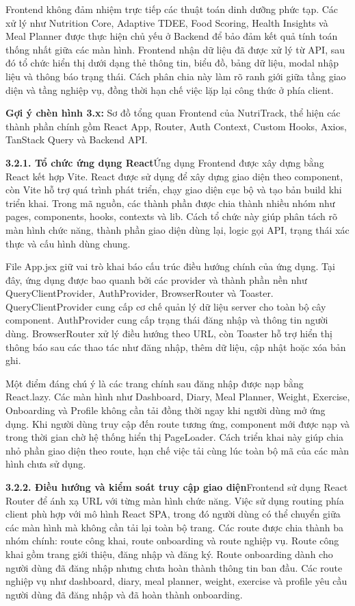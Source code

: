 Frontend không đảm nhiệm trực tiếp các thuật toán dinh dưỡng phức tạp. Các xử lý như Nutrition Core, Adaptive TDEE, Food Scoring, Health Insights và Meal Planner được thực hiện chủ yếu ở Backend để bảo đảm kết quả tính toán thống nhất giữa các màn hình. Frontend nhận dữ liệu đã được xử lý từ API, sau đó tổ chức hiển thị dưới dạng thẻ thông tin, biểu đồ, bảng dữ liệu, modal nhập liệu và thông báo trạng thái. Cách phân chia này làm rõ ranh giới giữa tầng giao diện và tầng nghiệp vụ, đồng thời hạn chế việc lặp lại công thức ở phía client.

\textbf{Gợi ý chèn hình 3.x:} Sơ đồ tổng quan Frontend của NutriTrack, thể hiện các thành phần chính gồm React App, Router, Auth Context, Custom Hooks, Axios, TanStack Query và Backend API.

\textbf{3.2.1. Tổ chức ứng dụng React}Ứng dụng Frontend được xây dựng bằng React kết hợp Vite. React được sử dụng để xây dựng giao diện theo component, còn Vite hỗ trợ quá trình phát triển, chạy giao diện cục bộ và tạo bản build khi triển khai. Trong mã nguồn, các thành phần được chia thành nhiều nhóm như pages, components, hooks, contexts và lib. Cách tổ chức này giúp phân tách rõ màn hình chức năng, thành phần giao diện dùng lại, logic gọi API, trạng thái xác thực và cấu hình dùng chung.

File App.jsx giữ vai trò khai báo cấu trúc điều hướng chính của ứng dụng. Tại đây, ứng dụng được bao quanh bởi các provider và thành phần nền như QueryClientProvider, AuthProvider, BrowserRouter và Toaster. QueryClientProvider cung cấp cơ chế quản lý dữ liệu server cho toàn bộ cây component. AuthProvider cung cấp trạng thái đăng nhập và thông tin người dùng. BrowserRouter xử lý điều hướng theo URL, còn Toaster hỗ trợ hiển thị thông báo sau các thao tác như đăng nhập, thêm dữ liệu, cập nhật hoặc xóa bản ghi.

Một điểm đáng chú ý là các trang chính sau đăng nhập được nạp bằng React.lazy. Các màn hình như Dashboard, Diary, Meal Planner, Weight, Exercise, Onboarding và Profile không cần tải đồng thời ngay khi người dùng mở ứng dụng. Khi người dùng truy cập đến route tương ứng, component mới được nạp và trong thời gian chờ hệ thống hiển thị PageLoader. Cách triển khai này giúp chia nhỏ phần giao diện theo route, hạn chế việc tải cùng lúc toàn bộ mã của các màn hình chưa sử dụng.

\textbf{3.2.2. Điều hướng và kiểm soát truy cập giao diện}Frontend sử dụng React Router để ánh xạ URL với từng màn hình chức năng. Việc sử dụng routing phía client phù hợp với mô hình React SPA, trong đó người dùng có thể chuyển giữa các màn hình mà không cần tải lại toàn bộ trang. Các route được chia thành ba nhóm chính: route công khai, route onboarding và route nghiệp vụ. Route công khai gồm trang giới thiệu, đăng nhập và đăng ký. Route onboarding dành cho người dùng đã đăng nhập nhưng chưa hoàn thành thông tin ban đầu. Các route nghiệp vụ như dashboard, diary, meal planner, weight, exercise và profile yêu cầu người dùng đã đăng nhập và đã hoàn thành onboarding.

